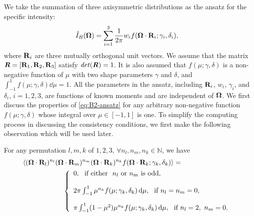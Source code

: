 We take the summation of three axisymmetric distributions as the
ansatz for the specific intensity:
\begin{equation}\label{eq:B2-ansatz}
  \bansatz(\bOmega) = \sum_{i = 1}^3 \dfrac1{2\pi} w_i 
  f(\bOmega\cdot\bR_i; \gamma_i, \delta_i),
\end{equation}
where $\mathbf{R}_i$ are three mutually orthogonal unit vectors. We assume that the matrix
$\boldsymbol{\mathit{R}} = \left[\mathbf{R}_1, \mathbf{R}_2, \mathbf{R}_3\right]$ satisfy $\mathit{det}(\boldsymbol{\mathit{R}}) = 1$.
It is also
assumed that $f(\mu; \gamma, \delta)$ is a non-negative function of
$\mu$ with two shape parameters $\gamma$ and $\delta$, and
$\displaystyle \int_{-1}^1 f(\mu; \gamma, \delta) \dd\mu = 1$. All the
parameters in the ansatz, including $\mathbf{R}_i$, $w_i$, $\gamma_i$, and
$\delta_i$, $i=1,2,3$, are functions of known moments and are
independent of $\boldsymbol{\Omega}$. We first discuss the properties of
\eqref{eq:B2-ansatz} for any arbitrary non-negative function
$f(\mu;\gamma,\delta)$ whose integral over $\mu\in[-1,1]$ is one.
To simplify the computing process in discussing the consistency conditions, we
first make the following observation which will be used later.
\begin{lemma}\label{lem:integral-orthogonal}
  For any permutation $l, m, k$ of $1, 2, 3$, $\forall
  n_l,n_m, n_k\in \mathbb{N}$, we have
  \[
    \begin{aligned}
      & \left\langle (\boldsymbol{\Omega}\cdot\mathbf{R}_l)^{n_l} (\boldsymbol{\Omega}\cdot\mathbf{R}_m)^{n_m} 
      (\boldsymbol{\Omega}\cdot\mathbf{R}_k)^{n_k} f(\boldsymbol{\Omega}\cdot\mathbf{R}_k; \gamma_k,
    \delta_k) \right\rangle = \\ & \qquad \qquad \qquad \left
      \{
        \begin{array}{l}
          0, ~~\text{if either }~n_l \text{ or } n_m \text{ is odd}, \\
          [4mm]

          2 \pi \int_{-1}^1 \mu^{n_k} f(\mu;\gamma_k, \delta_k) \,{\rm d}\mu, 
          ~~\text{if } n_l = n_m = 0, \\
          [4mm]

          \pi \int_{-1}^1 (1 - \mu^2) \mu^{n_k} f(\mu; \gamma_k,
          \delta_k) \,{\rm d}\mu, ~~\text{if } n_l = 2, ~n_m = 0.
        \end{array}\right.
      \end{aligned}
    \]
  \end{lemma}

